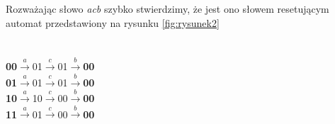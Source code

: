 \documentclass[12pt,a4paper]{article}
\begin{document}
Rozwa\.{z}aj\k{a}c s{\l}owo \textit{acb} szybko stwierdzimy, \.{z}e jest ono s{\l}owem resetuj\k{a}cym automat przedstawiony na rysunku \ref{fig:rysunek2}\\
\\\\
\textbf{00}$\xrightarrow{a}$01$\xrightarrow{c}$01$\xrightarrow{b}$\textbf{00}\\
\textbf{01}$\xrightarrow{a}$01$\xrightarrow{c}$01$\xrightarrow{b}$\textbf{00}\\
\textbf{10}$\xrightarrow{a}$10$\xrightarrow{c}$00$\xrightarrow{b}$\textbf{00}\\
\textbf{11}$\xrightarrow{a}$01$\xrightarrow{c}$00$\xrightarrow{b}$\textbf{00}\\
\\
\end{document}

